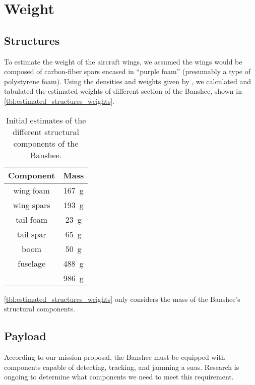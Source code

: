 \chapter{Weight}\label{cp:weight}

\section{Structures}

To estimate the weight of the aircraft wings, we assumed the wings would be composed of carbon-fiber spars encased in ``purple foam'' (presumably a type of polystyrene foam). Using the densities and weights given by \citet{grager2024}, we calculated and tabulated the estimated weights of different section of the Banshee, shown in \autoref{tbl:estimated_structures_weights}.

\begin{table}[htpb]
    \centering
    \caption[Initial structural weight estimates]{Initial estimates of the different structural components of the Banshee.}
    \begin{tabular}{cc}
        \toprule
        \textbf{Component} & \textbf{Mass} \\
        \midrule
        wing foam & \qty{167}{\gram} \\
        wing spars & \qty{193}{\gram} \\
        tail foam & \qty{23}{\gram} \\
        tail spar & \qty{65}{\gram} \\
        boom & \qty{50}{\gram} \\
        fuselage & \qty{488}{\gram} \\
        \bottomrule
        & \qty{986}{\gram} \\
    \end{tabular}
    \label{tbl:estimated_structures_weights}
\end{table}

\noindent \autoref{tbl:estimated_structures_weights} only considers the mass of the Banshee's structural components.

\section{Payload}

According to our mission proposal, the Banshee must be equipped with components capable of detecting, tracking, and jamming a \acrshort{suas}. Research is ongoing to determine what components we need to meet this requirement.

